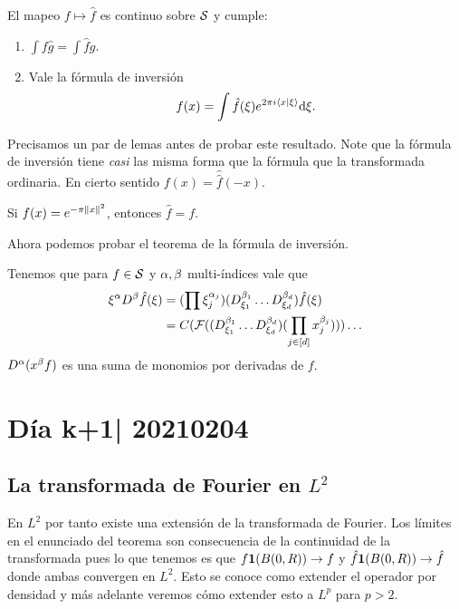 \documentclass[12pt]{memoir}
\begin{document}
\begin{Th}
  El mapeo $f\mapsto\hat f$ es continuo sobre $\mathcal{S}$ y cumple:
  \begin{enumerate}
    \item $\int f\hat g=\int\hat fg$.
    \item Vale la fórmula de inversión
     $$f(x)=\int\hat f(\xi)e^{2\pi i\braket{x}{\xi}}\dd\xi.$$
  \end{enumerate}
\end{Th}

Precisamos un par de lemas antes de probar este resultado. Note que la fórmula de inversión tiene \emph{casi} las misma forma que la fórmula que la transformada ordinaria. En cierto sentido $f(x)=\hat{\hat f}(-x)$.

\begin{Lem}
Si $f(x)=e^{-\pi\left\|x\right\|^2}$, entonces $\hat{f}=f$. 
\end{Lem}

\begin{ptcbp}
\end{ptcbp}

Ahora podemos probar el teorema de la fórmula de inversión.

\begin{ptcbp}
  Tenemos que para $f\in\mathcal{S}$ y $\alpha,\beta$ multi-índices vale que 
  \begin{align*}
    \xi^\alpha D^{\beta}\hat{f}(\xi)&=(\prod\xi_j^{\alpha_j})(D_{\xi_1}^{\beta_1}\dots D_{\xi_d}^{\beta_d})\hat{f}(\xi)\\
    &=C(\mathcal{F}((D_{\xi_1}^{\beta_1}\dots D_{\xi_d}^{\beta_d})(\prod_{j\in[d]}x_j^{\beta_j})))\dots
  \end{align*}
  $D^\alpha(x^\beta f)$ es una suma de monomios por derivadas de $f$.
\end{ptcbp}

\section{Día k+1| 20210204}

\subsection{La transformada de Fourier en $L^2$}
\par

En $L^2$ por tanto existe una extensión de la transformada de Fourier. Los límites en el enunciado del teorema son consecuencia de la continuidad de la transformada pues lo que tenemos es que $f\mathbf{1}(B(0,R))\to f$ y $\hat f\mathbf{1}(B(0,R))\to \hat f$ donde ambas convergen en $L^2$. Esto se conoce como extender el operador por densidad y más adelante veremos cómo extender esto a $L^p$ para $p>2$.
\end{document}

